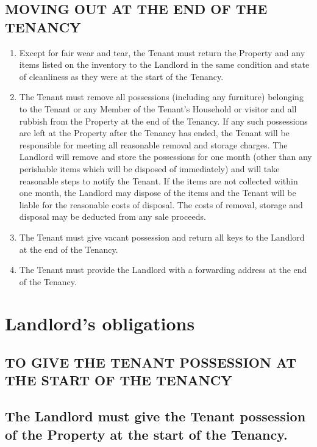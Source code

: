 \subsection{MOVING OUT AT THE END OF THE TENANCY}
\begin{enumerate}
\item{Except for fair wear and tear, the Tenant must return the Property and any items listed on the inventory to the Landlord in the same condition and state of cleanliness as they were at the start of the Tenancy.}
\item{The Tenant must remove all possessions (including any furniture) belonging to the Tenant or any Member of the Tenant's Household or visitor and all rubbish from the Property at the end of the Tenancy. If any such possessions are left at the Property after the Tenancy has ended, the Tenant will be responsible for meeting all reasonable removal and storage charges. The Landlord will remove and store the possessions for one month (other than any perishable items which will be disposed of immediately) and will take reasonable steps to notify the Tenant. If the items are not collected within one month, the Landlord may dispose of the items and the Tenant will be liable for the reasonable costs of disposal. The costs of removal, storage and disposal may be deducted from any sale proceeds.}


\item{The Tenant must give vacant possession and return all keys to the Landlord at the end of the Tenancy.}
\item{The Tenant must provide the Landlord with a forwarding address at the end of the Tenancy.}

\end{enumerate}

\section{Landlord's obligations}

\subsection{TO GIVE THE TENANT POSSESSION AT THE START OF THE TENANCY}

\subsection{The Landlord must give the Tenant possession of the Property at the start of the Tenancy.}
